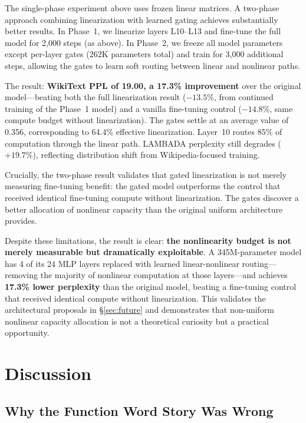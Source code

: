 \documentclass[11pt]{article}
\begin{document}
The single-phase experiment above uses frozen linear matrices. A two-phase approach combining linearization with learned gating achieves substantially better results. In Phase~1, we linearize layers L10--L13 and fine-tune the full model for 2,000 steps (as above). In Phase~2, we freeze all model parameters except per-layer gates (262K parameters total) and train for 3,000 additional steps, allowing the gates to learn soft routing between linear and nonlinear paths.

The result: \textbf{WikiText PPL of 19.00, a 17.3\% improvement} over the original model---beating both the full linearization result ($-13.5\%$, from continued training of the Phase~1 model) and a vanilla fine-tuning control ($-14.8\%$, same compute budget without linearization). The gates settle at an average value of 0.356, corresponding to 64.4\% effective linearization. Layer~10 routes 85\% of computation through the linear path. LAMBADA perplexity still degrades ($+19.7\%$), reflecting distribution shift from Wikipedia-focused training.

Crucially, the two-phase result validates that gated linearization is not merely measuring fine-tuning benefit: the gated model outperforms the control that received identical fine-tuning compute without linearization. The gates discover a better allocation of nonlinear capacity than the original uniform architecture provides.

\noindent Despite these limitations, the result is clear: \textbf{the nonlinearity budget is not merely measurable but dramatically exploitable}. A 345M-parameter model has 4 of its 24 MLP layers replaced with learned linear-nonlinear routing---removing the majority of nonlinear computation at those layers---and achieves \textbf{17.3\% lower perplexity} than the original model, beating a fine-tuning control that received identical compute without linearization. This validates the architectural proposals in \S\ref{sec:future} and demonstrates that non-uniform nonlinear capacity allocation is not a theoretical curiosity but a practical opportunity.

\section{Discussion}

\subsection{Why the Function Word Story Was Wrong}
\end{document}
